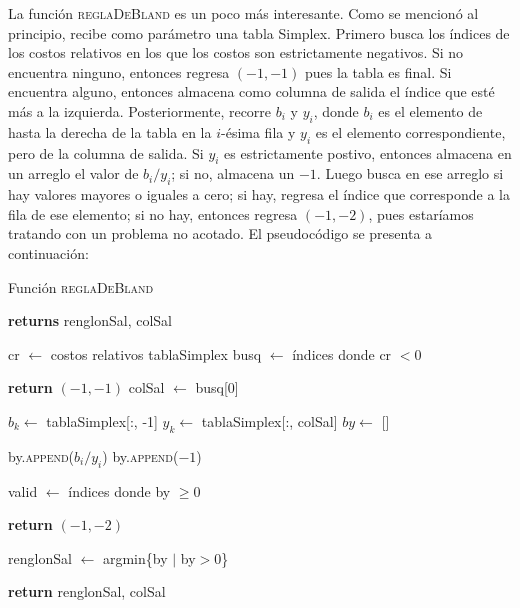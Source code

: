 \documentclass[12pt]{article}
\begin{document}
La función \textsc{reglaDeBland} es un poco más interesante. Como se mencionó al principio, recibe como parámetro una tabla Simplex. Primero busca los índices de los costos relativos en los que los costos son estrictamente negativos. Si no encuentra ninguno, entonces regresa $(-1, -1)$ pues la tabla es final. Si encuentra alguno, entonces almacena como columna de salida el índice que esté más a la izquierda. Posteriormente, recorre $b_i$ y $y_i$, donde $b_i$ es el elemento de hasta la derecha de la tabla en la $i$-ésima fila y $y_i$ es el elemento correspondiente, pero de la columna de salida. Si $y_i$ es estrictamente postivo, entonces almacena en un arreglo el valor de $b_i / y_i$; si no, almacena un $-1$. Luego busca en ese arreglo si hay valores mayores o iguales a cero; si hay, regresa el índice que corresponde a la fila de ese elemento; si no hay, entonces regresa $(-1,-2)$, pues estaríamos tratando con un problema no acotado. El pseudocódigo se presenta a continuación:
\begin{center}
    \begin{algorithm}[H]
    \caption{Función \textsc{reglaDeBland}}
    \begin{algorithmic}
     \textbf{returns} renglonSal, colSal 

    \State cr $\gets$ costos relativos tablaSimplex
    \State busq $\gets$ índices donde cr $< 0$

     
        \State \textbf{return} $(-1,-1)$
    \Else
        \State colSal $\gets$ busq[0]
    \EndIf

    \State $b_k \gets$ tablaSimplex[:, -1]
    \State $y_k \gets$ tablaSimplex[:, colSal]
    \State $by \gets$ []
    
            \State by.\textsc{append}($b_i/y_i$)
        \Else
        \State by.\textsc{append}($-1$)
        \EndIf
    \EndFor

    \State valid $\gets$ índices donde by $\geq 0$

     
        \State \textbf{return} $(-1,-2)$    
    \EndIf

    \State renglonSal $\gets$ argmin\{by $\mid$  by$>0$\}

    \State \textbf{return} renglonSal, colSal

    \EndFunction
    \end{algorithmic}
    \end{algorithm}
\end{center}
\end{document}
